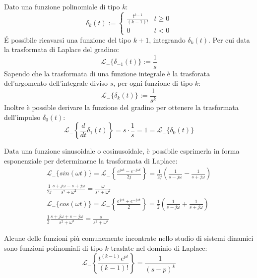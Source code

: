 \documentclass{article}
\numberwithin{equation}{subsection}
\begin{document}
Dato una funzione polinomiale di tipo $k$:
\begin{equation}
    \delta_k(t):=
    \begin{cases}
        \displaystyle\frac{t^{k-1}}{(k-1)!}&t\geq0\\
        0&t<0
    \end{cases}
\end{equation}
\'{E} possibile ricavarsi una funzione del tipo $k+1$, integrando $\delta_k(t)$. Per cui data la trasformata di Laplace del gradino:
\begin{equation}
    \mathscr{L}_-\{\delta_{-1}(t)\}:=\displaystyle\frac{1}{s}
\end{equation}
Sapendo che la trasformata di una funzione integrale è la trasforata del'argomento dell'integrale diviso $s$, per ogni funzione di tipo $k$:
\begin{equation}
    \mathscr{L}_-\{\delta_k(t)\}:=\displaystyle\frac{1}{s^k}
\end{equation}
Inoltre è possible derivare la funzione del gradino per ottenere la trasformata dell'impulso $\delta_0(t)$:
\begin{equation}
    \mathscr{L}_-\left\{\displaystyle\frac{d}{dt}\delta_1(t)\right\}=s\cdot\frac{1}{s}=1=\mathscr{L}_-\{\delta_0(t)\}
\end{equation}

Data una funzione sinusoidale o cosinusoidale, è possibile esprimerla in forma esponenziale per determinarne la trasformata di Laplace:
\begin{gather}
    \mathscr{L}_-\{sin(\omega t)\}=\mathscr{L}_-\left\{\displaystyle\frac{e^{j\omega t}-e^{-j\omega t}}{2j}\right\}=\frac{1}{2j}\left(\frac{1}{s-j\omega}-\frac{1}{s+j\omega}\right)\\
    \displaystyle\frac{1}{2j}\frac{s+j\omega-s+j\omega}{s^2+\omega^2}=\frac{\omega}{s^2+\omega^2}\\
    \mathscr{L}_-\{cos(\omega t)\}=\mathscr{L}_-\left\{\displaystyle\frac{e^{j\omega t}+e^{-j\omega t}}{2}\right\}=\frac{1}{2}\left(\frac{1}{s-j\omega}+\frac{1}{s+j\omega}\right)\\
    \displaystyle\frac{1}{2}\frac{s+j\omega+s-j\omega}{s^2+\omega^2}=\frac{s}{s^2+\omega^2}
\end{gather}

Alcune delle funzioni più comunemente incontrate nello studio di sistemi dinamici sono funzioni polinomiali di tipo $k$ traslate nel dominio di Laplace:
\begin{equation}
    \mathscr{L}_-\left\{\displaystyle\frac{t^{(k-1)}e^{pt}}{(k-1)!}\right\}=\frac{1}{(s-p)^k}
\end{equation}
\end{document}
